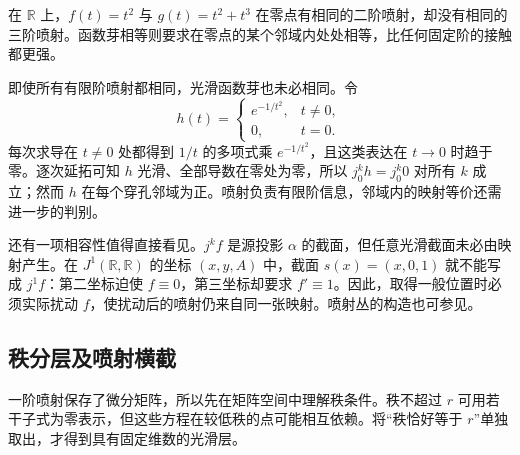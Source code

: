 \begin{example}\label{g2:exm:jet-versus-germ}
	在 \(\mathbb R\) 上，\(f(t)=t^2\) 与 \(g(t)=t^2+t^3\) 在零点有相同的二阶喷射，却没有相同的三阶喷射。函数芽相等则要求在零点的某个邻域内处处相等，比任何固定阶的接触都更强。

	即使所有有限阶喷射都相同，光滑函数芽也未必相同。令
	\[
		h(t)=\begin{cases}e^{-1/t^2},&t\ne0,\\0,&t=0.\end{cases}
	\]
	每次求导在 \(t\ne0\) 处都得到 \(1/t\) 的多项式乘 \(e^{-1/t^2}\)，且这类表达在 \(t\to0\) 时趋于零。逐次延拓可知 \(h\) 光滑、全部导数在零处为零，所以 \(j_0^kh=j_0^k0\) 对所有 \(k\) 成立；然而 \(h\) 在每个穿孔邻域为正。喷射负责有限阶信息，邻域内的映射等价还需进一步的判别。
\end{example}

还有一项相容性值得直接看见。\(j^k f\) 是源投影 \(\alpha\) 的截面，但任意光滑截面未必由映射产生。在 \(J^1(\mathbb R,\mathbb R)\) 的坐标 \((x,y,A)\) 中，截面 \(s(x)=(x,0,1)\) 就不能写成 \(j^1f\)：第二坐标迫使 \(f\equiv0\)，第三坐标却要求 \(f'\equiv1\)。因此，取得一般位置时必须实际扰动 \(f\)，使扰动后的喷射仍来自同一张映射。喷射丛的构造也可参见\cite[第II章第2节，定理2.7]{GolubitskyGuillemin1973}。

\subsection{秩分层及喷射横截}
\label{g2:subsec:D03:02}

一阶喷射保存了微分矩阵，所以先在矩阵空间中理解秩条件。秩不超过 \(r\) 可用若干子式为零表示，但这些方程在较低秩的点可能相互依赖。将“秩恰好等于 \(r\)”单独取出，才得到具有固定维数的光滑层。

